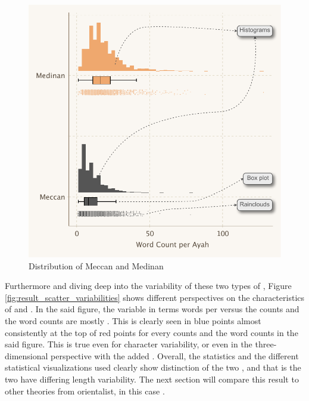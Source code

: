 \begin{figure}[!t]
    \centering
    \includegraphics[width=\textwidth]{img/plot3.pdf}
    \caption{Distribution of Meccan and Medinan  }
    \label{fig:result_meccan_medinan_dist}
\end{figure}

Furthermore and diving deep into the variability of these two types of  , Figure \ref{fig:result_scatter_variabilities} shows different perspectives on the characteristics of   and  . In the said figure, the variable   in terms words per   versus the   counts and the word counts are mostly  . This is clearly seen in blue points almost consistently at the top of red points for every   counts and the word counts in the said figure. This is true even for character variability, or even in the three-dimensional perspective with the added  . Overall, the statistics and the different statistical visualizations used clearly show distinction of the two  , and that is the two have differing   length variability. The next section will compare this result to other theories from orientalist, in this case \cite{sinai2020oqs}.

